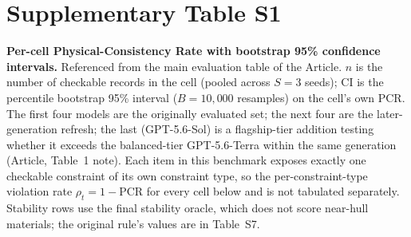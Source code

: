 \documentclass[11pt,a4paper]{article}
\begin{document}
\section*{Supplementary Table S1}
\noindent\textbf{Per-cell Physical-Consistency Rate with bootstrap 95\% confidence
intervals.} Referenced from the main evaluation table of the Article. $n$ is the number of checkable records in the cell
(pooled across $S=3$ seeds); CI is the percentile bootstrap 95\% interval ($B=10{,}000$
resamples) on the cell's own PCR. The first four models are the originally evaluated set;
the next four are the later-generation refresh; the last (GPT-5.6-Sol) is a flagship-tier
addition testing whether it exceeds the balanced-tier GPT-5.6-Terra within the same
generation (Article, Table~1 note). Each item in this benchmark exposes
exactly one checkable constraint of its own constraint type, so the per-constraint-type
violation rate $\rho_t=1-\mathrm{PCR}$ for every cell below and is not tabulated separately. Stability rows use
the final stability oracle, which does not score near-hull materials; the original rule's values are in
Table~S7.
\end{document}
